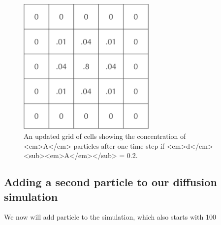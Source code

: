{{\begin{figure}[h]
\centering
\mySfFamily
\includegraphics[width = 0.6\textwidth]{../images/A_concentration_slower_diffusion.png}
\caption{An updated grid of cells showing the concentration of <em>A</em> particles after one time step if <em>d</em><sub><em>A</em></sub> = 0.2.}
\label{fig:A_concentration_slower_diffusion}
\end{figure}

\FloatBarrier
{}
\subsection{Adding a second particle to our diffusion simulation}

We now will add particle  to the simulation, which also starts with 100%

}}
